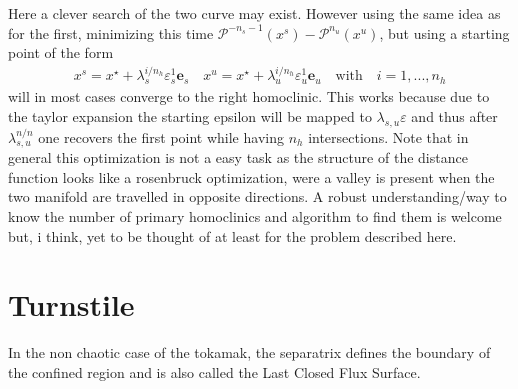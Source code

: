 Here a clever search of the two curve may exist. However using the same idea as for the first, minimizing this time $\mathcal{P}^{-n_s-1}(x^s) - \mathcal{P}^{n_u}(x^u)$, but using a starting point of the form     
\begin{align*}
       x^s = x^\star+\lambda_s^{i/n_h}\varepsilon_s^1 \textbf{e}_s \quad
x^u = x^\star+\lambda_u^{i/n_h}\varepsilon_u^1 \textbf{e}_u \quad\text{with}\quad i = 1,...,n_h
\end{align*}
will in most cases converge to the right homoclinic. This works because due to the taylor expansion the starting epsilon will be mapped to $\lambda_{s,u}\varepsilon$ and thus after $\lambda_{s,u}^{n/n}$ one recovers the first point while having $n_h$ intersections. Note that in general this optimization is not a easy task as the structure of the distance function looks like a rosenbruck optimization, were a valley is present when the two manifold are travelled in opposite directions. A robust understanding/way to know the number of primary homoclinics and algorithm to find them is welcome but, i think, yet to be thought of at least for the problem described here.

\section{Turnstile}

In the non chaotic case of the tokamak, the separatrix defines the boundary of the confined region and is also called the Last Closed Flux Surface. 

